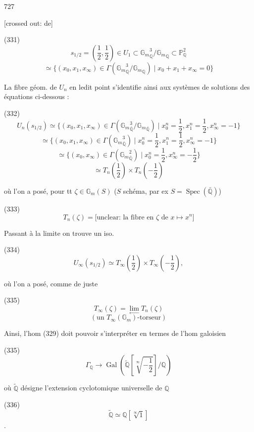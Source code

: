 \newpage


727

[crossed out: de]

(331) 
$$ s_{1/2} = (\frac{1}{2}, \frac{1}{2}) \in U_1 \subset {\mathbb{G}_m}_{\mathbb{Q}}^3 / {\mathbb{G}_m}_{\mathbb{Q}} \subset \mathbb{P}_{\mathbb{Q}}^2 $$
$$ \simeq \{ (x_0, x_1, x_\infty) \in \Gamma( {\mathbb{G}_m}_{\mathbb{Q}}^3 / {\mathbb{G}_m}_{\mathbb{Q}} ) \mid x_0 + x_1 + x_\infty = 0 \} $$

La fibre géom. de $U_n$ en ledit point s'identifie
ainsi aux systèmes de solutions des
équations ci-dessous :

(332) 
$$ U_n(s_{1/2}) \simeq \{ (x_0, x_1, x_\infty) \in \Gamma( {\mathbb{G}_m}_{\bar{\mathbb{Q}}}^3 / {\mathbb{G}_m}_{\bar{\mathbb{Q}}} ) \mid x_0^n = \frac{1}{2}, x_1^n = \frac{1}{2}, x_\infty^n = -1 \} $$
$$ \simeq \{ (x_0, x_1, x_\infty) \in \Gamma( {\mathbb{G}_m}_{\bar{\mathbb{Q}}}^3 ) \mid x_0^n = \frac{1}{2}, x_1^n = \frac{1}{2}, x_\infty^n = -1 \} $$
$$ \simeq \{ (x_0, x_\infty) \in \Gamma( {\mathbb{G}_m}_{\bar{\mathbb{Q}}}^2 ) \mid x_0^n = \frac{1}{2}, x_\infty^n = -\frac{1}{2} \} $$
$$ \simeq T_n(\frac{1}{2}) \times T_n(-\frac{1}{2}) $$

où l'on a posé, pour tt $\zeta \in \mathbb{G}_m(S)$ ($S$ schéma, par ex $S = \operatorname{Spec}(\bar{\mathbb{Q}})$)

(333) $$ T_n(\zeta) = \text{[unclear: la fibre en } \zeta \text{ de } x \mapsto x^n] $$

Passant à la limite on trouve
un iso.

(334) $$ U_\infty(s_{1/2}) \simeq T_\infty(\frac{1}{2}) \times T_\infty(-\frac{1}{2}) , $$

où l'on a posé, comme de juste

(335) $$ T_\infty(\zeta) = \lim_{\longleftarrow} T_n(\zeta) $$
$$ (\text{un } T_\infty(\mathbb{G}_m)\text{-torseur}) $$

\newpage


Ainsi, l'hom (329) doit pouvoir s'interpréter en termes de l'hom galoisien

(335) $$ \Gamma_{\mathbb{Q}} \longrightarrow \operatorname{Gal}( \tilde{\mathbb{Q}} [\sqrt[\infty]{-\frac{1}{2}}] / \mathbb{Q} ) $$

où $\tilde{\mathbb{Q}}$ désigne l'extension cyclotomique universelle de $\mathbb{Q}$

(336) $$ \tilde{\mathbb{Q}} \simeq \mathbb{Q} [\sqrt[\infty]{1}] $$ .

